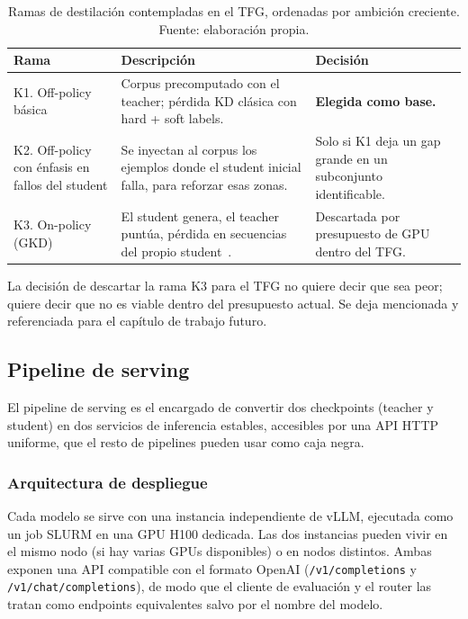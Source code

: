 \documentclass[11pt,a4paper]{article}
\begin{document}
\begin{table}[H]
\centering
\caption{Ramas de destilación contempladas en el TFG, ordenadas por ambición creciente. Fuente: elaboración propia.}
\label{tab:ramas-kd}
\footnotesize
\begin{tabularx}{\textwidth}{>{\raggedright\arraybackslash}p{3.5cm} >{\raggedright\arraybackslash}X >{\raggedright\arraybackslash}p{3.2cm}}
\toprule
\textbf{Rama} & \textbf{Descripción} & \textbf{Decisión} \\
\midrule
K1. Off-policy básica & Corpus precomputado con el teacher; pérdida KD clásica con hard + soft labels. & \textbf{Elegida como base.} \\
\addlinespace
K2. Off-policy con énfasis en fallos del student & Se inyectan al corpus los ejemplos donde el student inicial falla, para reforzar esas zonas. & Solo si K1 deja un gap grande en un subconjunto identificable. \\
\addlinespace
K3. On-policy (GKD) & El student genera, el teacher puntúa, pérdida en secuencias del propio student~\cite{agarwal2024gkd}. & Descartada por presupuesto de GPU dentro del TFG. \\
\bottomrule
\end{tabularx}
\end{table}

La decisión de descartar la rama K3 para el TFG no quiere decir que sea peor; quiere decir que no es viable dentro del presupuesto actual. Se deja mencionada y referenciada para el capítulo de trabajo futuro.

\subsection{Pipeline de serving}

El pipeline de serving es el encargado de convertir dos checkpoints (teacher y student) en dos servicios de inferencia estables, accesibles por una API HTTP uniforme, que el resto de pipelines pueden usar como caja negra.

\subsubsection{Arquitectura de despliegue}

Cada modelo se sirve con una instancia independiente de vLLM, ejecutada como un job SLURM en una GPU H100 dedicada. Las dos instancias pueden vivir en el mismo nodo (si hay varias GPUs disponibles) o en nodos distintos. Ambas exponen una API compatible con el formato OpenAI (\texttt{/v1/completions} y \texttt{/v1/chat/completions}), de modo que el cliente de evaluación y el router las tratan como endpoints equivalentes salvo por el nombre del modelo.
\end{document}
